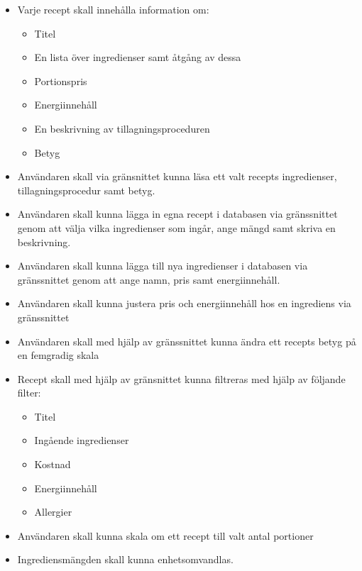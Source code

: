 \begin{itemize}
\item Varje recept skall innehålla information om:
  \begin{itemize}
    \item Titel
    \item En lista över ingredienser samt åtgång av dessa
    \item Portionspris
    \item Energiinnehåll
    \item En beskrivning av tillagningsproceduren
    \item Betyg
  \end{itemize}
\item Användaren skall via gränsnittet kunna läsa ett valt recepts ingredienser, tillagningsprocedur samt betyg.
\item Användaren skall kunna lägga in egna recept i databasen via gränssnittet genom att välja vilka ingredienser som ingår, ange mängd samt skriva en beskrivning.
\item Användaren skall kunna lägga till nya ingredienser i databasen via gränssnittet genom att ange namn, pris samt energiinnehåll.
\item Användaren skall kunna justera pris och energiinnehåll hos en ingrediens via gränssnittet
\item Användaren skall med hjälp av gränssnittet kunna ändra ett recepts betyg på en femgradig skala
\item Recept skall med hjälp av gränsnittet kunna filtreras med hjälp av följande filter:
  \begin{itemize}
    \item Titel
    \item Ingående ingredienser
    \item Kostnad
    \item Energiinnehåll
    \item Allergier
  \end{itemize}
\item Användaren skall kunna skala om ett recept till valt antal portioner
\item Ingrediensmängden skall kunna enhetsomvandlas.
\end{itemize}

